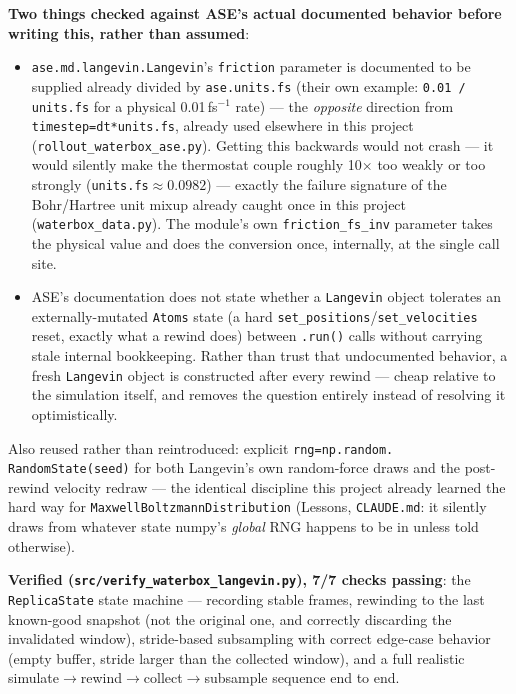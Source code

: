 \documentclass[11pt]{article}
\begin{document}
\textbf{Two things checked against ASE's actual documented behavior before
writing this, rather than assumed}:
\begin{itemize}
  \item \texttt{ase.md.langevin.Langevin}'s \texttt{friction} parameter is
  documented to be supplied already divided by \texttt{ase.units.fs}
  (their own example: \texttt{0.01 / units.fs} for a physical
  0.01\,fs$^{-1}$ rate) --- the \emph{opposite} direction from
  \texttt{timestep=dt*units.fs}, already used elsewhere in this project
  (\texttt{rollout\_waterbox\_ase.py}). Getting this backwards would not
  crash --- it would silently make the thermostat couple roughly 10$\times$
  too weakly or too strongly (\texttt{units.fs}$\approx0.0982$) --- exactly
  the failure signature of the Bohr/Hartree unit mixup already caught once
  in this project (\texttt{waterbox\_data.py}). The module's own
  \texttt{friction\_fs\_inv} parameter takes the physical value and does
  the conversion once, internally, at the single call site.
  \item ASE's documentation does not state whether a \texttt{Langevin}
  object tolerates an externally-mutated \texttt{Atoms} state (a hard
  \texttt{set\_positions}/\texttt{set\_velocities} reset, exactly what a
  rewind does) between \texttt{.run()} calls without carrying stale
  internal bookkeeping. Rather than trust that undocumented behavior, a
  fresh \texttt{Langevin} object is constructed after every rewind ---
  cheap relative to the simulation itself, and removes the question
  entirely instead of resolving it optimistically.
\end{itemize}
Also reused rather than reintroduced: explicit \texttt{rng=np.random.
RandomState(seed)} for both Langevin's own random-force draws and the
post-rewind velocity redraw --- the identical discipline this project
already learned the hard way for
\texttt{MaxwellBoltzmannDistribution} (Lessons, \texttt{CLAUDE.md}: it
silently draws from whatever state numpy's \emph{global} RNG happens to be
in unless told otherwise).

\textbf{Verified (\texttt{src/verify\_waterbox\_langevin.py}), 7/7 checks
passing}: the \texttt{ReplicaState} state machine --- recording stable
frames, rewinding to the last known-good snapshot (not the original one,
and correctly discarding the invalidated window), stride-based
subsampling with correct edge-case behavior (empty buffer, stride larger
than the collected window), and a full realistic
simulate$\to$rewind$\to$collect$\to$subsample sequence end to end.
\end{document}
